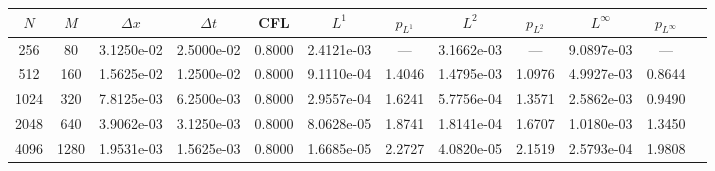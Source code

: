 \begin{tabular}{cccccccccccc}
\toprule
$N$ & $M$ & $\Delta x$ & $\Delta t$ & CFL & $L^1$ & $p_{L^1}$ & $L^2$ & $p_{L^2}$ & $L^\infty$ & $p_{L^\infty}$ \\
\midrule
256 & 80 & 3.1250e-02 & 2.5000e-02 & 0.8000 & 2.4121e-03 & --- & 3.1662e-03 & --- & 9.0897e-03 & --- \\
512 & 160 & 1.5625e-02 & 1.2500e-02 & 0.8000 & 9.1110e-04 & 1.4046 & 1.4795e-03 & 1.0976 & 4.9927e-03 & 0.8644 \\
1024 & 320 & 7.8125e-03 & 6.2500e-03 & 0.8000 & 2.9557e-04 & 1.6241 & 5.7756e-04 & 1.3571 & 2.5862e-03 & 0.9490 \\
2048 & 640 & 3.9062e-03 & 3.1250e-03 & 0.8000 & 8.0628e-05 & 1.8741 & 1.8141e-04 & 1.6707 & 1.0180e-03 & 1.3450 \\
4096 & 1280 & 1.9531e-03 & 1.5625e-03 & 0.8000 & 1.6685e-05 & 2.2727 & 4.0820e-05 & 2.1519 & 2.5793e-04 & 1.9808 \\
\bottomrule
\end{tabular}